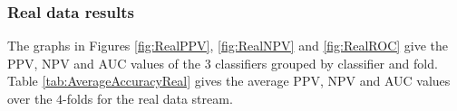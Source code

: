 \documentclass[11pt]{article}
\begin{document}
	\subsubsection{Real data results}
	The graphs in Figures \ref{fig:RealPPV}, \ref{fig:RealNPV} and \ref{fig:RealROC} give the PPV, NPV and AUC values of the 3 classifiers grouped by classifier and fold. Table \ref{tab:AverageAccuracyReal} gives the average PPV, NPV and AUC values over the $4$-folds for the real data stream.
	
	
	
	
	

	
	
\end{document}
